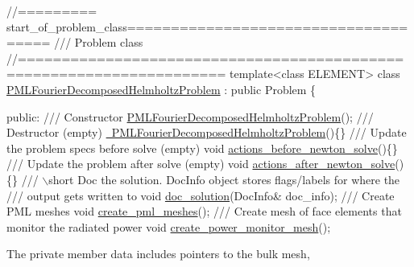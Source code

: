  
\begin{DoxyCodeInclude}
\textcolor{comment}{//========= start\_of\_problem\_class=====================================}
\textcolor{comment}{/// Problem class}
\textcolor{comment}{}\textcolor{comment}{//=====================================================================}
\textcolor{keyword}{template}<\textcolor{keyword}{class} ELEMENT>
\textcolor{keyword}{class }\hyperlink{classPMLFourierDecomposedHelmholtzProblem}{PMLFourierDecomposedHelmholtzProblem} : \textcolor{keyword}{public} Problem
\{

\textcolor{keyword}{public}:
\textcolor{comment}{}
\textcolor{comment}{ /// Constructor}
\textcolor{comment}{} \hyperlink{classPMLFourierDecomposedHelmholtzProblem_a5764db8312a28a3e1eaac2cc61813f83}{PMLFourierDecomposedHelmholtzProblem}();
\textcolor{comment}{}
\textcolor{comment}{ /// Destructor (empty)}
\textcolor{comment}{} \hyperlink{classPMLFourierDecomposedHelmholtzProblem_abc35779657bcdd622d09464c225b079a}{~PMLFourierDecomposedHelmholtzProblem}()\{\}
\textcolor{comment}{}
\textcolor{comment}{ /// Update the problem specs before solve (empty)}
\textcolor{comment}{} \textcolor{keywordtype}{void} \hyperlink{classPMLFourierDecomposedHelmholtzProblem_af87810cbe164981cc14ee779793a69fb}{actions\_before\_newton\_solve}()\{\}
\textcolor{comment}{}
\textcolor{comment}{ /// Update the problem after solve (empty)}
\textcolor{comment}{} \textcolor{keywordtype}{void} \hyperlink{classPMLFourierDecomposedHelmholtzProblem_a013d95d489b85e326a71bb744af4a40f}{actions\_after\_newton\_solve}()\{\}
\textcolor{comment}{}
\textcolor{comment}{ /// \(\backslash\)short Doc the solution. DocInfo object stores flags/labels for where the}
\textcolor{comment}{ /// output gets written to}
\textcolor{comment}{} \textcolor{keywordtype}{void} \hyperlink{classPMLFourierDecomposedHelmholtzProblem_afcdfaf86efc75fbea14f6ade9eeb7f9c}{doc\_solution}(DocInfo& doc\_info);
\textcolor{comment}{}
\textcolor{comment}{ /// Create PML meshes}
\textcolor{comment}{} \textcolor{keywordtype}{void} \hyperlink{classPMLFourierDecomposedHelmholtzProblem_ae562dddf5c60793371b594bff5047f91}{create\_pml\_meshes}();
\textcolor{comment}{}
\textcolor{comment}{ /// Create mesh of face elements that monitor the radiated power}
\textcolor{comment}{} \textcolor{keywordtype}{void} \hyperlink{classPMLFourierDecomposedHelmholtzProblem_a83e0aa333ec3b25f1afccc3bc0a529ad}{create\_power\_monitor\_mesh}();

\end{DoxyCodeInclude}


The private member data includes pointers to the bulk mesh,

